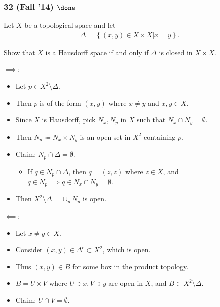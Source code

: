 \hypertarget{fall-14-done-1}{%
\subsubsection{\texorpdfstring{32 (Fall '14)
\(\done\)}{32 (Fall '14) \textbackslash done}}\label{fall-14-done-1}}

Let \(X\) be a topological space and let
\begin{align*}
\Delta = \left\{{(x, y) \in X \times X \mathrel{\Big|}x = y}\right\}
.\end{align*}

Show that \(X\) is a Hausdorff space if and only if \(\Delta\) is closed
in \(X \times X\).

\begin{solution}

\hfill

\begin{concept}

\hfill

\end{concept}

\(\implies\):

\begin{itemize}
\tightlist
\item
  Let \(p\in X^2\setminus \Delta\).
\item
  Then \(p\) is of the form \((x, y)\) where \(x\neq y\) and
  \(x,y\in X\).
\item
  Since \(X\) is Hausdorff, pick \(N_x, N_y\) in \(X\) such that
  \(N_x \cap N_y = \emptyset\).
\item
  Then \(N_p\coloneqq N_x \times N_y\) is an open set in \(X^2\)
  containing \(p\).
\item
  Claim: \(N_p \cap\Delta = \emptyset\).

  \begin{itemize}
  \tightlist
  \item
    If \(q \in N_p \cap\Delta\), then \(q = (z, z)\) where \(z\in X\),
    and \(q\in N_p \implies q\in N_x \cap N_y = \emptyset\).
  \end{itemize}
\item
  Then \(X^2\setminus \Delta = \cup_p N_p\) is open.
\end{itemize}

\(\impliedby\):

\begin{itemize}
\tightlist
\item
  Let \(x\neq y\in X\).
\item
  Consider \((x, y) \in \Delta^c \subset X^2\), which is open.
\item
  Thus \((x, y) \in B\) for some box in the product topology.
\item
  \(B = U \times V\) where \(U\ni x, V\ni y\) are open in \(X\), and
  \(B \subset X^2\setminus \Delta\).
\item
  Claim: \(U\cap V = \emptyset\).


\end{itemize}
\end{solution}
